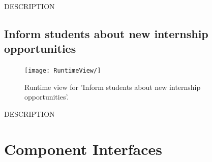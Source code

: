 DESCRIPTION


\subsection{Inform students about new internship opportunities}
\begin{figure}[H]
    \begin{center}
        \texttt{[image: RuntimeView/]}
        \caption{Runtime view for 'Inform students about new internship opportunities'.}
        \label{fig:runtime_modifybadge}%
    \end{center}
\end{figure}

DESCRIPTION





\section{Component Interfaces}
\label{sec:component_interfaces}%
